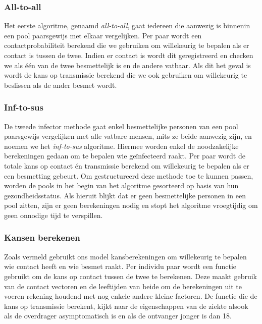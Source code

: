 \begin{appendices}
\subsubsection{All-to-all}
Het eerste algoritme, genaamd \textit{all-to-all}, gaat iedereen die aanwezig is binnenin een pool paarsgewijs met elkaar vergelijken. Per paar wordt een contactprobabiliteit berekend die we gebruiken om willekeurig te bepalen als er contact is tussen de twee. Indien er contact is wordt dit geregistreerd en checken we als één van de twee besmettelijk is en de andere vatbaar. Als dit het geval is wordt de kans op transmissie berekend die we ook gebruiken om willekeurig te beslissen als de ander besmet wordt.

\subsubsection{Inf-to-sus}
De tweede infector methode gaat enkel besmettelijke personen van een pool paarsgewijs vergelijken met alle vatbare mensen, mits ze beide aanwezig zijn, en noemen we het \textit{inf-to-sus} algoritme. Hiermee worden enkel de noodzakelijke berekeningen gedaan om te bepalen wie geïnfecteerd raakt. Per paar wordt de totale kans op contact én transmissie berekend om willekeurig te bepalen als er een besmetting gebeurt. Om gestructureerd deze methode toe te kunnen passen, worden de pools in het begin van het algoritme gesorteerd op basis van hun gezondheidsstatus. Als hieruit blijkt dat er geen besmettelijke personen in een pool zitten, zijn er geen berekeningen nodig en stopt het algoritme vroegtijdig om geen onnodige tijd te verspillen.

\subsubsection{Kansen berekenen}
Zoals vermeld gebruikt ons model kansberekeningen om willekeurig te bepalen wie contact heeft en wie besmet raakt. Per individu paar wordt een functie gebruikt om de kans op contact tussen de twee te berekenen. Deze maakt gebruik van de contact vectoren en de leeftijden van beide om de berekeningen uit te voeren rekening houdend met nog enkele andere kleine factoren. De functie die de kans op transmissie berekent, kijkt naar de eigenschappen van de ziekte alsook als de overdrager asymptomatisch is en als de ontvanger jonger is dan 18.


\end{appendices}
